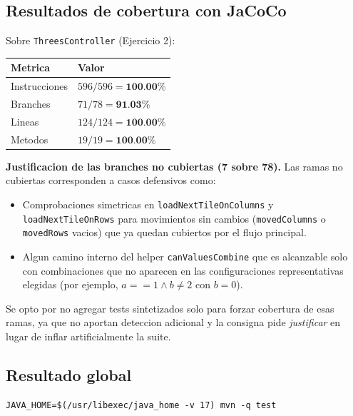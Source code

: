 \documentclass[12pt,a4paper]{article}
\begin{document}
\subsection{Resultados de cobertura con JaCoCo}

Sobre \texttt{ThreesController} (Ejercicio 2):

\begin{center}
\begin{tabular}{ll}
\toprule
Metrica & Valor \\
\midrule
Instrucciones & $596/596 = \textbf{100.00\%}$ \\
Branches      & $71/78 = \textbf{91.03\%}$ \\
Lineas        & $124/124 = \textbf{100.00\%}$ \\
Metodos       & $19/19 = \textbf{100.00\%}$ \\
\bottomrule
\end{tabular}
\end{center}

\textbf{Justificacion de las branches no cubiertas (7 sobre 78).} Las ramas no cubiertas
corresponden a casos defensivos como:

\begin{itemize}
  \item Comprobaciones simetricas en \texttt{loadNextTileOnColumns} y
  \texttt{loadNextTileOnRows} para movimientos sin cambios (\texttt{movedColumns} o
  \texttt{movedRows} vacios) que ya quedan cubiertos por el flujo principal.
  \item Algun camino interno del helper \texttt{canValuesCombine} que es alcanzable solo con
  combinaciones que no aparecen en las configuraciones representativas elegidas (por
  ejemplo, $a == 1 \wedge b \neq 2$ con $b = 0$).
\end{itemize}

Se opto por no agregar tests sintetizados solo para forzar cobertura de esas ramas, ya que
no aportan deteccion adicional y la consigna pide \emph{justificar} en lugar de inflar
artificialmente la suite.

\subsection{Resultado global}

\begin{lstlisting}[style=codestyle]
JAVA_HOME=$(/usr/libexec/java_home -v 17) mvn -q test
\end{lstlisting}
\end{document}
